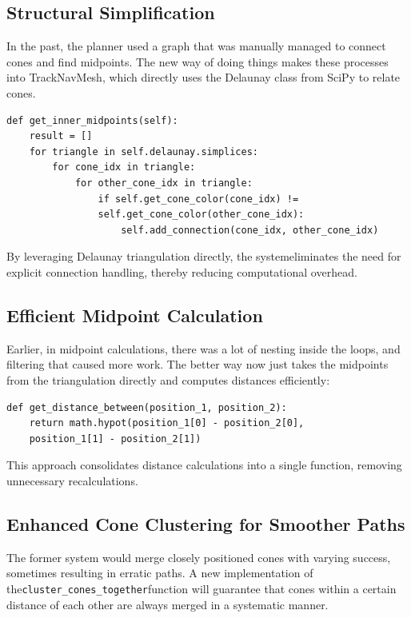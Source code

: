 \documentclass[a4paper,11pt]{report}
\begin{document}
\subsection{Structural Simplification}

In the past, the planner used a graph that was manually managed to connect cones and find midpoints.
The new way of doing things makes these processes into TrackNavMesh, which directly uses the Delaunay class from SciPy to relate cones.

\begin{verbatim}
def get_inner_midpoints(self):
    result = []
    for triangle in self.delaunay.simplices:
        for cone_idx in triangle:
            for other_cone_idx in triangle:
                if self.get_cone_color(cone_idx) != 
                self.get_cone_color(other_cone_idx):
                    self.add_connection(cone_idx, other_cone_idx)
\end{verbatim}

By leveraging Delaunay triangulation directly, the systemeliminates the need for explicit connection handling, thereby reducing computational overhead.

\subsection{Efficient Midpoint Calculation}

Earlier, in midpoint calculations, there was a lot of nesting 
inside the loops, and filtering that caused more work.
The better way now just takes the midpoints from the triangulation directly and computes distances efficiently:

\begin{verbatim}
def get_distance_between(position_1, position_2):
    return math.hypot(position_1[0] - position_2[0], 
    position_1[1] - position_2[1])
\end{verbatim}

This approach consolidates distance calculations into a single function, removing unnecessary recalculations.

\subsection{Enhanced Cone Clustering for Smoother Paths}

The former system would merge closely positioned cones with
varying success, sometimes resulting in erratic paths. A new
implementation of the\texttt{cluster\_cones\_together}function will
guarantee that cones within a certain distance of each other are
always merged in a systematic manner.
\end{document}
